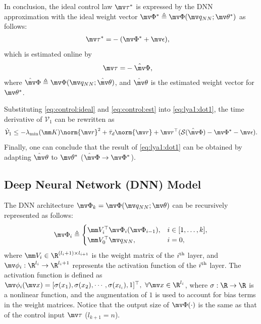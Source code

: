 \documentclass[lettersize,journal]{IEEEtran}
\newcommand*{\sat}{\mathcal{S}}
\newcommand*{\fe}{\mv r}
\newcommand*{\q}{\mv q}
\newcommand*{\NN}{\mv\Phi}
\newcommand*{\act}{\mv\phi}
\newcommand*{\wth}{\mv\theta}
\newcommand*{\wV}{\mm V}
\begin{document}
In conclusion, the ideal control law $\mv\tau^*$ is expressed by the DNN approximation with the ideal weight vector $\NN^*\triangleq\NN(\q_{NN};\wth^*)$ as follows:
\begin{align}
    \mv\tau^*=& -(\NN^*+\mv\epsilon),
    \label{eq:control:ideal}
\end{align}
which is estimated online by
\begin{align}
    \mv\tau =& -\hat\NN,
    \label{eq:control:est}
\end{align}
where $\hat\NN\triangleq\NN(\q_{NN};\hat\wth)$, and  $\hat\wth$ is the estimated weight vector for $\wth^*$.

Substituting \eqref{eq:control:ideal} and \eqref{eq:control:est} into \eqref{eq:lya1:dot1}, the time derivative of $\mathcal V_1$ can be rewritten as
\begin{equation}
    \dot{\mathcal V}_1
    \le 
    -\lambda_\text{min}(\mm K)\norm{\fe}^2
    +
    \bar\tau_d\norm{\fe}
    +
    \fe^\top (\sat(\hat\NN)-\NN^*-\mv\epsilon)
    .
    \label{eq:lya1:dot2}
\end{equation}
Finally, one can conclude that the result of \eqref{eq:lya1:dot1} can be obtained by adapting $\hat\wth$ to $\wth^*$ (\ie $\hat\NN\to\NN^*$).

\subsection{Deep Neural Network (DNN) Model}\label{NN definition}

The DNN architecture $\NN_k = \NN(\q_{NN};\wth)$ can be recursively represented as follows:
\begin{equation}
    \NN_i \triangleq
    \begin{cases}
        \wV_i^\top \NN_i(\NN_{i-1}), 
        &
        i\in[1,\dots,k],
        \\
        \wV_0^\top \q_{NN},
        &
        i=0
        ,
    \end{cases}
    \label{eq. DNN structure 2}
\end{equation}
where $\wV_i\in\R^{(l_i+1)\times l_{i+1}}$ is the weight matrix of the $i\textsuperscript{th}$ layer, and $\act_i: \R^{l_i}\to\R^{l_i+1}$ represents the activation function of the $i\textsuperscript{th}$ layer. 
The activation function is defined as $\act_i(\mv x)=[\sigma(x_1),\sigma(x_2),\cdots, \sigma(x_{l_{i}}), 1]^\top,\ \forall\mv x\in\R^{l_i}$, where $\sigma: \R\to\R$ is a nonlinear function, and the augmentation of $1$ is used to account for bias terms in the weight matrices. 
Notice that the output size of $\NN(\cdot)$ is the same as that of the control input $\mv\tau$ (\ie $l_{k+1}=n$). 
\end{document}
